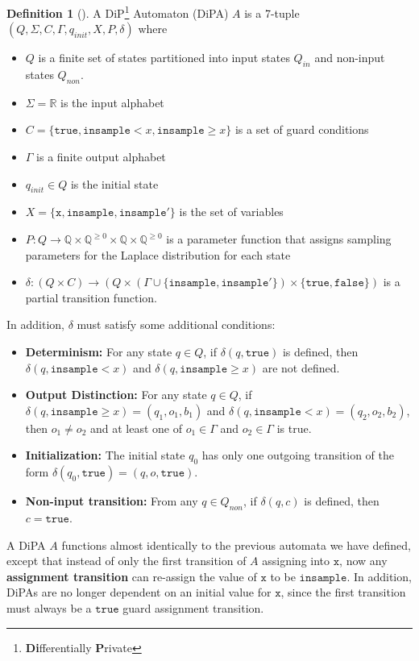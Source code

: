 \documentclass[12pt]{article}
\newcommand{\QQ}{\mathbb{Q}}
\newcommand{\RR}{\mathbb{R}}
\newcommand{\gguard}[1][x]{\texttt{insample}\geq #1}
\newcommand{\lguard}[1][x]{\texttt{insample} < #1}
\theoremstyle{definition}
\newtheorem{defn}[thm]{Definition}
\begin{document}
\begin{defn}[\cite{chadhaLinearTimeDecidability2021}]
    A DiP\footnote{\textbf{Di}fferentially \textbf{P}rivate} Automaton (DiPA) $A$ is a 7-tuple $(Q, \Sigma, C, \Gamma, q_{init}, X, P, \delta)$ where
    \begin{itemize}
        \item $Q$ is a finite set of states partitioned into input states $Q_{in}$ and non-input states $Q_{non}$. 
        \item $\Sigma = \RR$ is the input alphabet
        \item $C = \{\texttt{true}, \lguard, \gguard\}$ is a set of guard conditions
        \item $\Gamma$ is a finite output alphabet
        \item $q_{init}\in Q$ is the initial state
        \item $X = \{\texttt{x}, \texttt{insample}, \texttt{insample}'\}$ is the set of variables
        \item $P: Q\to \QQ\times \QQ^{\geq 0}\times \QQ\times  \QQ^{\geq 0}$ is a parameter function that assigns sampling parameters for the Laplace distribution for each state
        \item $\delta:(Q\times C)\to (Q\times (\Gamma \cup \{\texttt{insample}, \texttt{insample}'\})\times \{\texttt{true}, \texttt{false}\})$ is a partial transition function. 
    \end{itemize}
    In addition, $\delta$ must satisfy some additional conditions:
    
    \begin{itemize}
        \item \textbf{Determinism:} For any state $q\in Q$, if $\delta(q,\texttt{true})$ is defined, then $\delta(q,\lguard)$ and $\delta(q,\gguard)$ are not defined. 

        \item \textbf{Output Distinction:} For any state $q\in Q$, if $\delta(q, \gguard) = (q_1, o_1, b_1)$ and $\delta(q, \lguard) = (q_2, o_2, b_2)$, then $o_1\neq o_2$ and at least one of $o_1\in \Gamma$ and $o_2\in \Gamma$ is true.

        \item \textbf{Initialization:} The initial state $q_0$ has only one outgoing transition of the form $\delta(q_0, \texttt{true}) = (q, o, \texttt{true})$.

        \item \textbf{Non-input transition:} From any $q\in Q_{non}$, if $\delta(q, c)$ is defined, then $c=\texttt{true}$.
    \end{itemize}

    A DiPA $A$ functions almost identically to the previous automata we have defined, except that instead of only the first transition of $A$ assigning into $\texttt{x}$, now any \textbf{assignment transition} can re-assign the value of $\texttt{x}$ to be $\texttt{insample}$. In addition, DiPAs are no longer dependent on an initial value for $\texttt{x}$, since the first transition must always be a $\texttt{true}$ guard assignment transition.
\end{defn}
\end{document}
